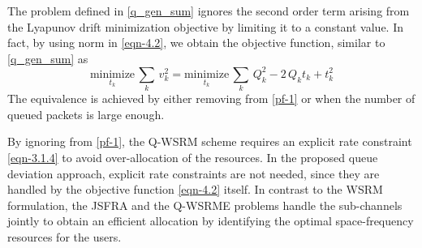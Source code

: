 The problem defined in \eqref{q_gen_sum} ignores the second order term arising from the Lyapunov drift minimization objective by limiting it to a constant value. In fact, by using  norm in \eqref{eqn-4.2}, we obtain the objective function, similar to \eqref{q_gen_sum} as
\begin{equation}\label{pf-1}
\underset{t_k}{\text{minimize}} \, \sum_k \, v_k^2 = \underset{t_k}{\text{minimize}} \, \sum_k \, Q_k^2 - 2 \, Q_k t_k + t_k^2
\end{equation}
The equivalence is achieved by either removing  from \eqref{pf-1} or when the number of queued packets is large enough.

By ignoring  from \eqref{pf-1}, the \ac{Q-WSRM} scheme requires an explicit rate constraint \eqref{eqn-3.1.4} to avoid over-allocation of the resources. In the proposed queue deviation approach, explicit rate constraints are not needed, since they are handled by the objective function \eqref{eqn-4.2} itself. In contrast to the \ac{WSRM} formulation, the \ac{JSFRA} and the \ac{Q-WSRME} problems handle the sub-channels jointly to obtain an efficient allocation by identifying the optimal space-frequency resources for the users.

